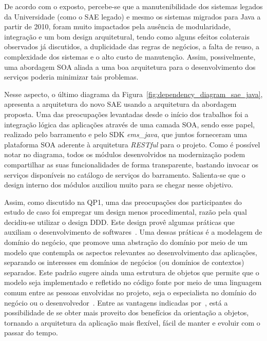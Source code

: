 De acordo com o exposto, percebe-se que a manutenibilidade dos sistemas legados da Universidade
(como o \acrshort{SAE} legado) e mesmo os sistemas migrados para Java a partir de 2010,
foram muito impactados pela ausência de modularidade, integração e um bom design arquitetural, tendo como alguns efeitos colaterais observados já discutidos, a duplicidade das regras de negócios, a falta de reuso, a complexidade dos sistemas e o alto custo de manutenção. Assim, possivelmente, uma abordagem SOA aliada a uma boa arquitetura para o desenvolvimento dos serviços poderia minimizar tais problemas.

Nesse aspecto, o último diagrama da Figura~\ref{fig:dependency_diagram_sae_java}, apresenta a arquitetura do novo \acrshort{SAE} usando a arquitetura da abordagem proposta. Uma das preocupações levantadas desde o início dos trabalhos foi a integração lógica das aplicações através de uma camada \acrshort{SOA}, sendo esse papel, realizado pelo barramento e pelo \acrshort{SDK} \emph{ems\_java}, que juntos forneceram uma plataforma \acrshort{SOA} aderente à arquitetura \emph{RESTful} para o projeto. Como é possível notar no diagrama, todos os módulos desenvolvidos na modernização podem compartilhar as suas funcionalidades de forma transparente, bastando invocar os serviços disponíveis no catálogo de serviços do barramento. Salienta-se que o design interno dos módulos auxiliou muito para se chegar nesse objetivo. 

Assim, como discutido na QP1, uma das preocupações dos participantes do estudo de caso foi
empregar um design menos procedimental, razão pela qual decidiu-se utilizar o design \acrshort{DDD}. Este design provê algumas práticas que auxiliam o desenvolvimento de softwares~\cite{evans2004domain}. Uma dessas práticas é a modelagem de domínio do negócio, que promove uma abstração do domínio por meio de um modelo que contempla os aspectos relevantes ao desenvolvimento das aplicações, separando os interesses em domínios de negócios (ou domínios de contextos) separados. Este padrão sugere ainda uma estrutura de objetos que permite que o modelo seja implementado e refletido no código fonte por meio de uma linguagem comum entre as pessoas envolvidas no projeto, seja o especialista no domínio do negócio ou o desenvolvedor~\cite{evans2004domain,vernon2013implementing}. Entre as vantagens indicadas por~\cite{evans2004domain}, está a possibilidade de se obter mais proveito dos benefícios da orientação a objetos, tornando a arquitetura da aplicação mais flexível, fácil de manter e evoluir
com o passar do tempo. 

